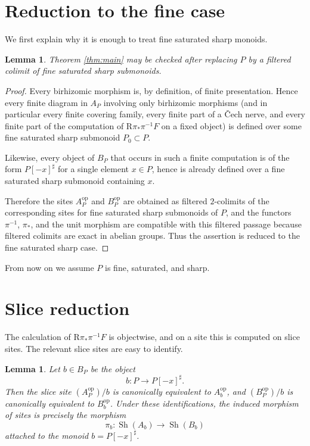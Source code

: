 \documentclass[11pt]{article}
\newtheorem{lemma}[theorem]{Lemma}
\theoremstyle{remark}
\newcommand{\Sh}{\operatorname{Sh}}
\newcommand{\R}{\mathrm{R}}
\begin{document}
\section{Reduction to the fine case}

We first explain why it is enough to treat fine saturated sharp monoids.

\begin{lemma}\label{lem:reduce-fs}
Theorem \ref{thm:main} may be checked after replacing $P$ by a filtered colimit of
fine saturated sharp submonoids.
\end{lemma}

\begin{proof}
Every birhizomic morphism is, by definition, of finite presentation.
Hence every finite diagram in $A_P$ involving only birhizomic morphisms
(and in particular every finite covering family, every finite part of a \v Cech nerve,
and every finite part of the computation of $\R\pi_*\pi^{-1}F$ on a fixed object)
is defined over some fine saturated sharp submonoid $P_0\subset P$.

Likewise, every object of $B_P$ that occurs in such a finite computation is of the form
$P[-x]^\sharp$ for a single element $x\in P$, hence is already defined over a fine
saturated sharp submonoid containing $x$.

Therefore the sites $A_P^{\mathrm{op}}$ and $B_P^{\mathrm{op}}$ are obtained as filtered
$2$-colimits of the corresponding sites for fine saturated sharp submonoids of $P$,
and the functors $\pi^{-1}$, $\pi_*$, and the unit morphism are compatible with this
filtered passage because filtered colimits are exact in abelian groups.
Thus the assertion is reduced to the fine saturated sharp case.
\end{proof}

From now on we assume $P$ is fine, saturated, and sharp.

\section{Slice reduction}

The calculation of $\R\pi_*\pi^{-1}F$ is objectwise, and on a site this is computed on
slice sites.  The relevant slice sites are easy to identify.

\begin{lemma}\label{lem:slice}
Let $b\in B_P$ be the object
\[
b\colon P\to P[-x]^\sharp.
\]
Then the slice site $(A_P^{\mathrm{op}})/b$ is canonically equivalent to
$A_b^{\mathrm{op}}$, and $(B_P^{\mathrm{op}})/b$ is canonically equivalent to
$B_b^{\mathrm{op}}$.  Under these identifications, the induced morphism of sites is
precisely the morphism
\[
\pi_b\colon \Sh(A_b)\to \Sh(B_b)
\]
attached to the monoid $b=P[-x]^\sharp$.
\end{lemma}
\end{document}

